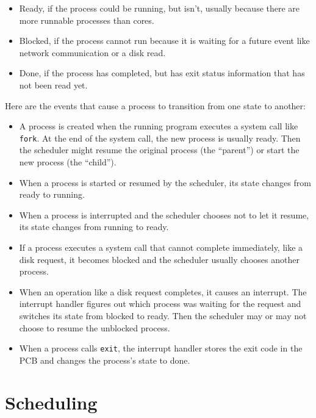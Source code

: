 \documentclass[12pt]{book}
\begin{document}
{\begin{itemize}
\item Ready, if the process could be running, but isn't, usually because
there are more runnable processes than cores.

\item Blocked, if the process cannot run because it is waiting for
a future event like network communication or a disk read.

\item Done, if the process has completed, but has exit status
information that has not been read yet.

\end{itemize}

Here are the events that cause a process to transition from one state to another:

\begin{itemize}

\item A process is created when the running program executes a system
  call like {\tt fork}.  At the end of the system call, the new
  process is usually ready.  Then the scheduler might resume the
  original process (the ``parent'') or start the new process (the
  ``child'').

\item When a process is started or resumed by the scheduler, its state
  changes from ready to running.

\item When a process is interrupted and the scheduler chooses not
  to let it resume, its state changes from running to ready.

\item If a process executes a system call that cannot complete
  immediately, like a disk request, it becomes blocked
  and the scheduler usually chooses another process.

\item When an operation like a disk request completes, it causes an
  interrupt.  The interrupt handler figures out which process was
  waiting for the request and switches its state from
  blocked to ready.  Then the scheduler may or may not choose to
  resume the unblocked process.

\item When a process calls {\tt exit}, the interrupt handler stores
  the exit code in the PCB and changes the process's state to done.

\end{itemize}


\section{Scheduling}

}
\end{document}
